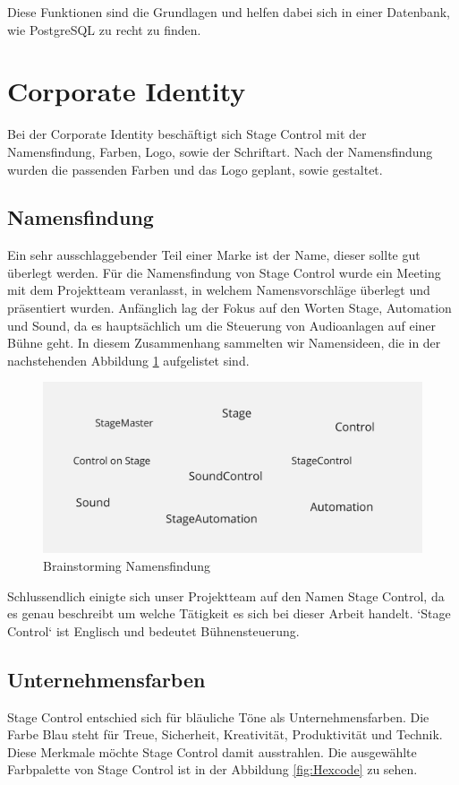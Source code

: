 Diese Funktionen sind die Grundlagen und helfen dabei sich in einer Datenbank, wie PostgreSQL zu recht zu finden.

\section{Corporate Identity}
Bei der Corporate Identity beschäftigt sich Stage Control mit der Namensfindung, Farben, Logo, sowie der Schriftart. Nach der Namensfindung wurden die passenden Farben und das Logo geplant, sowie gestaltet.

\subsection{Namensfindung}
Ein sehr ausschlaggebender Teil einer Marke ist der Name, dieser sollte gut überlegt werden. Für die Namensfindung von Stage Control wurde ein Meeting mit dem Projektteam veranlasst, in welchem Namensvorschläge überlegt und präsentiert wurden. 
Anfänglich lag der Fokus auf den Worten Stage, Automation und Sound, da es hauptsächlich um die Steuerung von Audioanlagen auf einer Bühne geht. In diesem Zusammenhang sammelten wir Namensideen, die in der nachstehenden Abbildung \ref{fig:Brainstorming_Namensfindung} aufgelistet sind. 

\begin{figure}[H]
	\centering
	\includegraphics[width=0.5\linewidth]{images/Brainstorming_Namensfindung.png}
	\caption[Brainstorming Namensfindung]{Brainstorming Namensfindung}
	\label{fig:Brainstorming_Namensfindung}
\end{figure}

Schlussendlich einigte sich unser Projektteam auf den Namen Stage Control, da es genau beschreibt um welche Tätigkeit es sich bei dieser Arbeit handelt. ‘Stage Control‘ ist Englisch und bedeutet Bühnensteuerung. 

\subsection{Unternehmensfarben}
Stage Control entschied sich für bläuliche Töne als Unternehmensfarben. Die Farbe Blau steht für Treue, Sicherheit, Kreativität, Produktivität und Technik. \parencite{BedeutungderFarbeBlau} Diese Merkmale möchte Stage Control damit ausstrahlen. Die ausgewählte Farbpalette von Stage Control ist in der Abbildung \ref{fig:Hexcode} zu sehen. 

